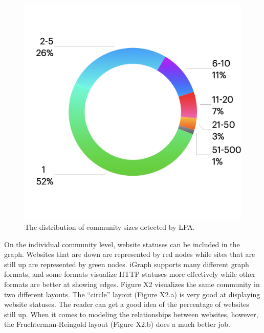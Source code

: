 \documentclass[conference]{IEEEtran}
\begin{document}
\begin{figure}[htbp]
 \centerline{\includegraphics[width=\columnwidth]{CommunitySizeDistribution.png}}
 \caption{The distribution of community sizes detected by LPA.}
\end{figure}

On the individual community level, website statuses can be included in the graph. Websites that are down are represented by red nodes while sites that are still up are represented by green nodes. iGraph supports many different graph formats, and some formats visualize HTTP statuses more effectively while other formats are better at showing edges. Figure X2 visualizes the same community in two different layouts. The “circle” layout (Figure X2.a) is very good at displaying website statuses. The reader can get a good idea of the percentage of websites still up. When it comes to modeling the relationships between websites, however, the Fruchterman-Reingold layout \cite{fruchterman1991graph}(Figure X2.b) does a much better job.
\end{document}
